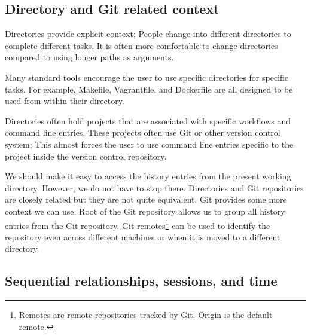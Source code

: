 

\subsection{Directory and Git related context}

Directories provide explicit context; People change into different directories to complete different tasks.\cite{greenberg1993computer} It is often more comfortable to change directories compared to using longer paths as arguments. 

Many standard tools encourage the user to use specific directories for specific tasks. 
For example, Makefile, Vagrantfile, and Dockerfile are all designed to be used from within their directory\cite{man-make}\cite{docs-vagrantfile}\cite{docs-dockerfile}. 

Directories often hold projects that are associated with specific workflows and command line entries. 
These projects often use Git or other version control system; This almost forces the user to use command line entries specific to the project inside the version control repository. 

We should make it easy to access the history entries from the present working directory.
However, we do not have to stop there. Directories and Git repositories are closely related but they are not quite equivalent. Git provides some more context we can use. 
Root of the Git repository allows us to group all history entries from the Git repository.
Git remotes\footnote{Remotes are remote repositories tracked by Git. Origin is the default remote.} can be used to identify the repository even across different machines or when it is moved to a different directory. 




\subsection{Sequential relationships, sessions, and time}


